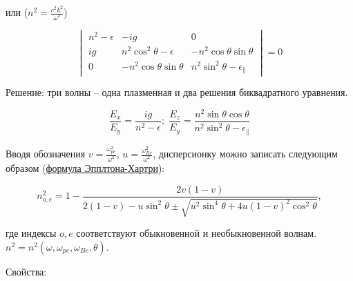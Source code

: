 \documentclass[10pt, a4paper]{article}
\begin{document}
или ($n^2=\frac{c^2 k^2}{\omega^2}$)

\begin{equation*}
	\begin{vmatrix}
		n^2-\epsilon & -ig & 0 \\
		ig & n^2\cos^2\theta-\epsilon & -n^2\cos\theta\sin\theta \\
		0 & -n^2\cos\theta\sin\theta & n^2\sin^2\theta-\epsilon_\parallel
	\end{vmatrix}=0
\end{equation*}

Решение: три волны -- одна плазменная и два решения биквадратного уравнения.

\begin{equation*}
	\frac{E_x}{E_y}=\frac{ig}{n^2-\epsilon};\;\frac{E_z}{E_y}=\frac{n^2\sin\theta\cos\theta}{n^2\sin^2\theta-\epsilon_\parallel}
\end{equation*}

Вводя обозначения $v=\frac{\omega_{pe}^2}{\omega^2}$, $u=\frac{\omega_{Be}^2}{\omega^2}$, дисперсионку можно записать следующим образом (\uline{формула Эпплтона-Хартри}):

\begin{equation} \label{eq:Appleton_Hartree_eq}
	n_{o,e}^2=1-\frac{2v(1-v)}{2(1-v)-u\sin^2\theta \pm \sqrt{u^2 \sin^4\theta+4u(1-v)^2 \cos^2\theta}}, 
\end{equation}

где индексы $o, e$ соответствуют обыкновенной и необыкновенной волнам. $n^2=n^2(\omega,\omega_{pe},\omega_{Be},\theta)$. 

Свойства:
\end{document}
